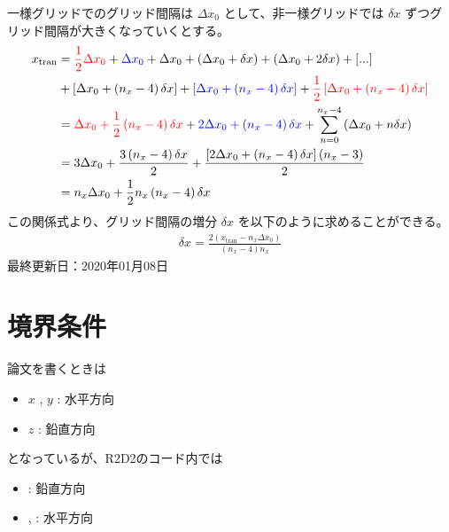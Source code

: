 \documentclass[letterpaper,10pt,dvipdfmx,report]{sphinxmanual}
\begin{document}
一様グリッドでのグリッド間隔は \(\Delta x_0\) として、非一様グリッドでは \(\delta x\) ずつグリッド間隔が大きくなっていくとする。
\begin{equation*}
\begin{split}x_\mathrm{tran}&={\color{red} \frac{1}{2} \Delta x_0} + {\color{blue} \Delta x_0} + \Delta x_0
+ \left(\Delta x_0 + \delta x\right)
+ \left(\Delta x_0 + 2\delta x\right) + [...] \\
&+ \left[\Delta x_0 + \left(n_x - 4\right)\delta x\right]
+ {\color{blue}\left[\Delta x_0 + \left(n_x - 4\right)\delta x\right]}
+ {\color{red}\frac{1}{2}\left[\Delta x_0 + \left(n_x - 4\right)\delta x\right]} \\
&= {\color{red} \Delta x_0 + \frac{1}{2}\left(n_x-4\right)\delta x}
+{\color{blue} 2\Delta x_0 + \left(n_x - 4\right)\delta x}
+ \sum_{n=0}^{n_x - 4}\left(\Delta x_0 + n\delta x\right) \\
&= 3\Delta x_0 + \frac{3\left(n_x-4\right)\delta x}{2}
+ \frac{\left[2\Delta x_0 + \left(n_x-4\right)\delta x\right]\left(n_x - 3\right)}{2} \\
&= n_x \Delta x_0 + \frac{1}{2} n_x\left(n_x - 4\right)\delta x\end{split}
\end{equation*}
この関係式より、グリッド間隔の増分 \(\delta x\) を以下のように求めることができる。
\begin{equation*}
\begin{split}\delta x = \frac{2\left(x_\mathrm{tran} - n_x\Delta x_0\right)}{\left(n_x - 4\right)n_x}\end{split}
\end{equation*}
最終更新日：2020年01月08日


\chapter{境界条件}
\label{\detokenize{boundary:id1}}\label{\detokenize{boundary::doc}}
論文を書くときは
\begin{itemize}
\item {} 
\(x\) , \(y\) : 水平方向

\item {} 
\(z\) : 鉛直方向

\end{itemize}

となっているが、R2D2のコード内では
\begin{itemize}
\item {} 
: 鉛直方向

\item {} 
, : 水平方向

\end{itemize}
\end{document}
